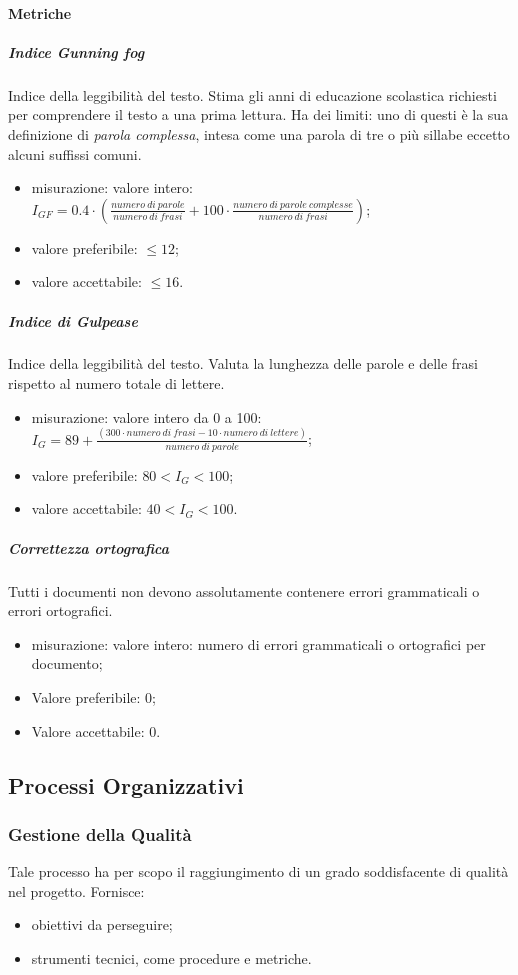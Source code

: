 		\paragraph{Metriche}
			\subparagraph{Indice Gunning fog}
			Indice della leggibilità del testo. Stima gli anni di educazione scolastica richiesti per comprendere il testo a una prima lettura.\newline
			Ha dei limiti: uno di questi è la sua definizione di \textit{parola complessa}, intesa come una parola di tre o più sillabe eccetto alcuni suffissi comuni.
			\begin{itemize}
				\item misurazione: valore intero: $ I_{GF} = 0.4 \cdot
				(
				\frac{numero\ di\ parole}{numero\ di\  frasi}
				+ 100 \cdot
				\frac{numero\ di\ parole\ complesse}{numero\ di\  frasi}
				) $;
				\item valore preferibile: $ \leq 12$;
				\item valore accettabile: $ \leq 16$.
			\end{itemize}
			\subparagraph{Indice di Gulpease}
			Indice della leggibilità del testo. Valuta la lunghezza delle parole e delle frasi rispetto al numero totale di lettere. 
			\begin{itemize}
				\item misurazione: valore intero da 0 a 100:\newline 	
				$I_G = 89+ \frac{(300 \cdot numero\ di\ frasi - 10 \cdot numero\ di\ lettere)}{numero\ di\ parole}$;	
				\item valore preferibile: $80 < I_G < 100$;
				\item valore accettabile: $40 < I_G < 100$.
			\end{itemize}
			\subparagraph{Correttezza ortografica}
			Tutti i documenti non devono assolutamente contenere errori grammaticali o errori ortografici. 
			\begin{itemize}
				\item misurazione: valore intero: numero di errori grammaticali o ortografici per documento;
				\item Valore preferibile: 0;
				\item Valore accettabile: 0.
			\end{itemize}
			
\subsection{Processi Organizzativi}
	\subsubsection{Gestione della Qualità}
	Tale processo ha per scopo il raggiungimento di un grado soddisfacente di qualità nel progetto. Fornisce:
	\begin{itemize}
		\item obiettivi da perseguire;
		\item strumenti tecnici, come procedure e metriche.
	\end{itemize}
